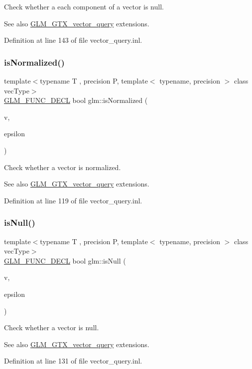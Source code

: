 Check whether a each component of a vector is null. \begin{DoxySeeAlso}{See also}
\hyperlink{group__gtx__vector__query}{G\+L\+M\+\_\+\+G\+T\+X\+\_\+vector\+\_\+query} extensions. 
\end{DoxySeeAlso}


Definition at line 143 of file vector\+\_\+query.\+inl.

\mbox{\label{group__gtx__vector__query_ga6fa5fa2af67d14c205d24c49aad03270}} 
\subsubsection{\texorpdfstring{is\+Normalized()}{isNormalized()}}
{\footnotesize\ttfamily template$<$typename T , precision P, template$<$ typename, precision $>$ class vec\+Type$>$ \\
\hyperlink{setup_8hpp_ab2d052de21a70539923e9bcbf6e83a51}{G\+L\+M\+\_\+\+F\+U\+N\+C\+\_\+\+D\+E\+CL} bool glm\+::is\+Normalized (\begin{DoxyParamCaption}\item[{vec\+Type$<$ T, P $>$ const \&}]{v,  }\item[{T const \&}]{epsilon }\end{DoxyParamCaption})}

Check whether a vector is normalized. \begin{DoxySeeAlso}{See also}
\hyperlink{group__gtx__vector__query}{G\+L\+M\+\_\+\+G\+T\+X\+\_\+vector\+\_\+query} extensions. 
\end{DoxySeeAlso}


Definition at line 119 of file vector\+\_\+query.\+inl.

\mbox{\label{group__gtx__vector__query_ga81a64edc1a2b470b82896592e89c523b}} 
\subsubsection{\texorpdfstring{is\+Null()}{isNull()}}
{\footnotesize\ttfamily template$<$typename T , precision P, template$<$ typename, precision $>$ class vec\+Type$>$ \\
\hyperlink{setup_8hpp_ab2d052de21a70539923e9bcbf6e83a51}{G\+L\+M\+\_\+\+F\+U\+N\+C\+\_\+\+D\+E\+CL} bool glm\+::is\+Null (\begin{DoxyParamCaption}\item[{vec\+Type$<$ T, P $>$ const \&}]{v,  }\item[{T const \&}]{epsilon }\end{DoxyParamCaption})}

Check whether a vector is null. \begin{DoxySeeAlso}{See also}
\hyperlink{group__gtx__vector__query}{G\+L\+M\+\_\+\+G\+T\+X\+\_\+vector\+\_\+query} extensions. 
\end{DoxySeeAlso}


Definition at line 131 of file vector\+\_\+query.\+inl.

